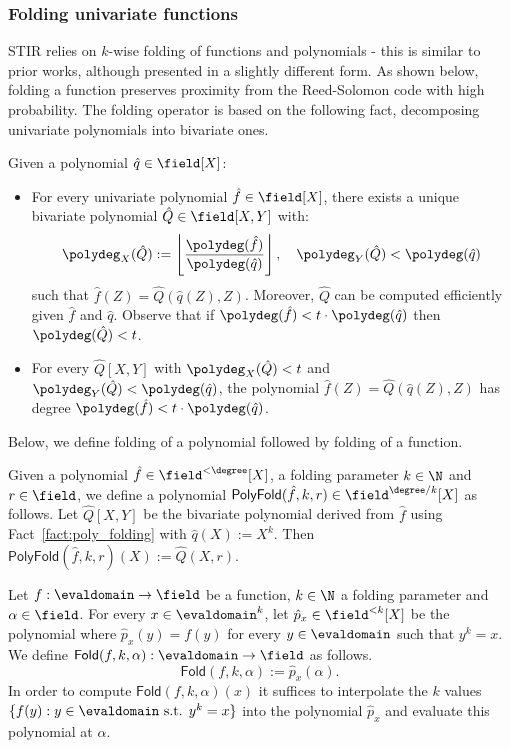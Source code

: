 \subsubsection{Folding univariate functions}\label{sec:folding_uf}
STIR relies on $k$-wise folding of functions and polynomials - this is similar to prior works, although presented in a slightly different form. As shown below, folding a function preserves proximity from the Reed-Solomon code with high probability. The folding operator is based on the following fact, decomposing univariate polynomials into bivariate ones.

\begin{lemma}\label{fact:poly_folding}
Given a polynomial $\hat{q}\in\field[X]$:
\begin{itemize}
        \item For every univariate polynomial $\hat{f}\in\field[X]$, there exists a unique bivariate polynomial $\hat{Q}\in\field[X,Y]$ with:
        \[
          \polydeg_X(\hat{Q}) := \left\lfloor \frac{\polydeg(\hat{f})}{\polydeg(\hat{q})} \right\rfloor,\quad \polydeg_Y(\hat{Q}) < \polydeg(\hat{q})
        \]
        such that $\hat{f}(Z)=\hat{Q}(\hat{q}(Z),Z)$. Moreover, $\hat{Q}$ can be computed efficiently given $\hat{f}$ and $\hat{q}$. Observe that if $\polydeg(\hat{f})<t\cdot\polydeg(\hat{q})$ then
        $\polydeg(\hat{Q})<t$.

        \item For every $\hat{Q}[X,Y]$ with $\polydeg_X(\hat{Q})<t$ and $\polydeg_Y(\hat{Q})<\polydeg(\hat{q})$, the polynomial $\hat{f}(Z)=\hat{Q}(\hat{q}(Z),Z)$ has degree $\polydeg(\hat{f})<t\cdot\polydeg(\hat{q})$.
\end{itemize}
\end{lemma}

Below, we define folding of a polynomial followed by folding of a function.
\begin{definition}\label{def:poly_folding}
    Given a polynomial $\hat{f}\in\field^{<\degree}[X]$, a folding parameter $k\in\N$ and $r\in\field$, we define a polynomial $\mathsf{PolyFold}(\hat{f},k,r)\in\field^{\degree/k}[X]$ as follows. Let $\hat{Q}[X,Y]$ be the bivariate polynomial derived from $\hat{f}$ using Fact~\ref{fact:poly_folding} with $\hat{q}(X):=X^k$. Then $\mathsf{PolyFold}(\hat{f},k,r)(X):=\hat{Q}(X,r)$.
\end{definition}

\begin{definition}\label{def:fn_folding}
Let $f:\evaldomain\rightarrow\field$ be a function, $k\in\N$ a folding parameter and $\alpha\in\field$. For every $x\in{\evaldomain}^k$, let $\hat{p}_x\in\field^{<k}[X]$ be the polynomial where $\hat{p}_x(y)=f(y)$ for every $y\in{\evaldomain}$ such that $y^k=x$. We define $\mathsf{Fold}(f,k,\alpha):\evaldomain\rightarrow\field$ as follows.
\[
    \mathsf{Fold}(f,k,\alpha):=\hat{p}_x(\alpha).
\]
In order to compute $\mathsf{Fold}(f,k,\alpha)(x)$ it suffices to interpolate the $k$ values $\{f(y):y\in\evaldomain\text{ s.t. }y^k=x\}$ into the polynomial $\hat{p}_x$ and evaluate this polynomial at $\alpha$.
\end{definition}

